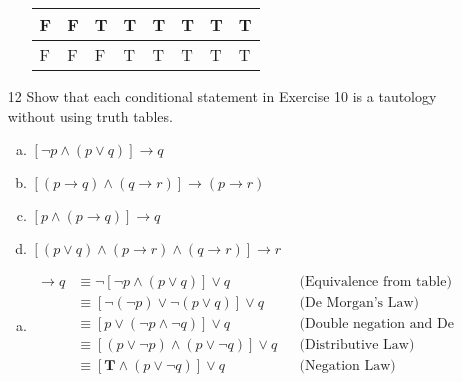 \begin{itemize}
\begin{enumerate}[a.]
\begin{tabular}{*{6}{|l} *{2}{|p{3.2cm}}|}
                        \hline
                        F          & F          & T          & T          & T         & T         & T                                             & T                                                    \\
                        \hline
                        F          & F          & F          & T          & T         & T         & T                                             & T                                                    \\
                        \hline
                    \end{tabular}

          \end{enumerate}
    \item[12]Show that each conditional statement in Exercise 10 is a tautology without using truth tables.
          \begin{enumerate}[a.]
              \item $[\neg p \land (p \lor q)] \to q$
              \item $[(p \to q) \land (q \to r)] \to (p \to r)$
              \item $[p \land (p \to q)] \to q$
              \item $[(p \lor q) \land (p \to r) \land (q \to r)] \to r$
          \end{enumerate}
          \answer
          \begin{enumerate}[a.]
              \item \begin{align*}
                        [\neg p \land (p \lor q)] \to q
                         & \equiv \neg[\neg p \land (p \lor q)] \lor q                         &  & \text{(Equivalence from table)}              \\
                         & \equiv [\neg(\neg p) \lor \neg(p \lor q)] \lor q                    &  & \text{(De Morgan's Law)}                     \\
                         & \equiv [p \lor (\neg p \land \neg q)] \lor q                        &  & \text{(Double negation and De Morgan's Law)} \\
                         & \equiv [(p \lor \neg p) \land (p \lor \neg q)] \lor q               &  & \text{(Distributive Law)}                    \\
                         & \equiv [\mathbf{T} \land (p \lor \neg q)] \lor q                    &  & \text{(Negation Law)}                        \\

\end{align*}
\end{enumerate}
\end{itemize}
